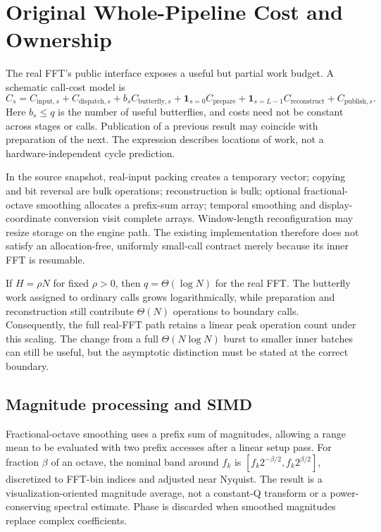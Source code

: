 \section{Original Whole-Pipeline Cost and Ownership}
\label{sec:cost}
The real FFT's public interface exposes a useful but partial work budget.
A schematic call-cost model is
\begin{equation}
 C_s=C_{\mathrm{input},s}+C_{\mathrm{dispatch},s}
       +b_s C_{\mathrm{butterfly},s}
       +\mathbf{1}_{s=0}C_{\mathrm{prepare}}
       +\mathbf{1}_{s=L-1}C_{\mathrm{reconstruct}}
       +C_{\mathrm{publish},s}.
 \label{eq:cost}
\end{equation}
Here $b_s\le q$ is the number of useful butterflies, and costs need not be
constant across stages or calls. Publication of a previous result may coincide
with preparation of the next. The expression describes locations of work,
not a hardware-independent cycle prediction.

In the source snapshot, real-input packing creates a temporary vector;
copying and bit reversal are bulk operations; reconstruction is bulk; optional
fractional-octave smoothing allocates a prefix-sum array; temporal smoothing
and display-coordinate conversion visit complete arrays. Window-length
reconfiguration may resize storage on the engine path. The existing
implementation therefore does not satisfy an allocation-free, uniformly
small-call contract merely because its inner FFT is resumable.

If $H=\rho N$ for fixed $\rho>0$, then $q=\Theta(\log N)$ for the real FFT.
The butterfly work assigned to ordinary calls grows logarithmically, while
preparation and reconstruction still contribute $\Theta(N)$ operations to
boundary calls. Consequently, the full real-FFT path retains a linear peak
operation count under this scaling. The change from a full
$\Theta(N\log N)$ burst to smaller inner batches can still be useful, but the
asymptotic distinction must be stated at the correct boundary.

\subsection{Magnitude processing and SIMD}
Fractional-octave smoothing uses a prefix sum of magnitudes, allowing a range
mean to be evaluated with two prefix accesses after a linear setup pass. For
fraction $\beta$ of an octave, the nominal band around $f_k$ is
$[f_k2^{-\beta/2},f_k2^{\beta/2}]$, discretized to FFT-bin indices and adjusted
near Nyquist. The result is a visualization-oriented magnitude average, not a
constant-Q transform or a power-conserving spectral estimate. Phase is discarded
when smoothed magnitudes replace complex coefficients.

